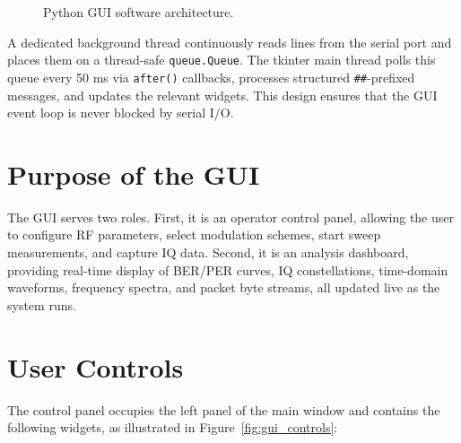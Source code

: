 \documentclass[12pt, a4paper, oneside]{report}
\begin{document}
\begin{figure}[H]
{%
  }
  \caption{Python GUI software architecture.}
  \label{fig:gui_arch}
\end{figure}

A dedicated background thread continuously reads lines from the serial port and places them on a thread-safe \texttt{queue.Queue}. The tkinter main thread polls this queue every 50 ms via \texttt{after()} callbacks, processes structured \texttt{\#\#}-prefixed messages, and updates the relevant widgets. This design ensures that the GUI event loop is never blocked by serial I/O.

\section{Purpose of the GUI}

The GUI serves two roles. First, it is an operator control panel, allowing the user to configure RF parameters, select modulation schemes, start sweep measurements, and capture IQ data. Second, it is an analysis dashboard, providing real-time display of BER/PER curves, IQ constellations, time-domain waveforms, frequency spectra, and packet byte streams, all updated live as the system runs.

\section{User Controls}

The control panel occupies the left panel of the main window and contains the following widgets, as illustrated in Figure~\ref{fig:gui_controls}:
\end{document}
